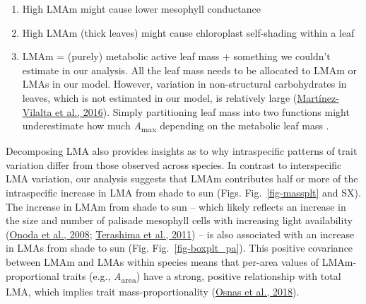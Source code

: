 \documentclass[
  12pt,
  a4paper,
,tablecaptionabove
]{scrartcl}
\providecommand{\tightlist}{%
  \setlength{\itemsep}{0pt}\setlength{\parskip}{0pt}}
\begin{document}
\begin{enumerate}
\def\labelenumi{\arabic{enumi}.}
\tightlist
\item
  High LMAm might cause lower mesophyll conductance
\item
  High LMAm (thick leaves) might cause chloroplast self-shading within a
  leaf
\item
  LMAm = (purely) metabolic active leaf mass + something we couldn't
  estimate in our analysis. All the leaf mass needs to be allocated to
  LMAm or LMAs in our model. However, variation in non-structural
  carbohydrates in leaves, which is not estimated in our model, is
  relatively large
  (\protect\hyperlink{ref-Martinez-Vilalta2016}{Martínez-Vilalta et al.,
  2016}). Simply partitioning leaf mass into two functions might
  underestimate how much \emph{A}\textsubscript{max} depending on the
  metabolic leaf mass .
\end{enumerate}

Decomposing LMA also provides insights as to why intraspecific patterns
of trait variation differ from those observed across species. In
contrast to interspecific LMA variation, our analysis suggests that LMAm
contributes half or more of the intraspecific increase in LMA from shade
to sun (Figs. Fig.~\ref{fig-massplt} and SX). The increase in LMAm from
shade to sun -- which likely reflects an increase in the size and number
of palisade mesophyll cells with increasing light availability
(\protect\hyperlink{ref-Onoda2008}{Onoda et al., 2008};
\protect\hyperlink{ref-Terashima2011}{Terashima et al., 2011}) -- is
also associated with an increase in LMAs from shade to sun (Fig.
Fig.~\ref{fig-boxplt_pa}). This positive covariance between LMAm and
LMAs within species means that per-area values of LMAm-proportional
traits (e.g., \emph{A}\textsubscript{area}) have a strong, positive
relationship with total LMA, which implies trait mass-proportionality
(\protect\hyperlink{ref-Osnas2018}{Osnas et al., 2018}).
\end{document}
